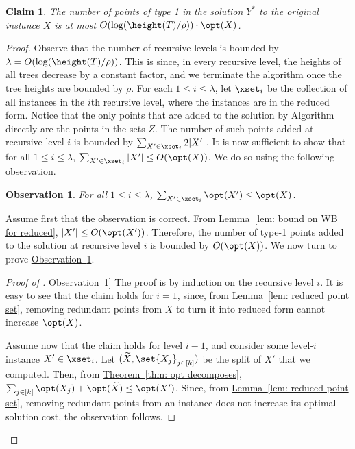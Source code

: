 \documentclass[11pt]{article}
\numberwithin{equation}{section}
\newtheorem{claim}[theorem]{Claim}
\theoremstyle{definition}
\theoremstyle{plain}
\newcommand{\expref}[2]{\hyperref[#2]{#1~\ref{#2}}}
\newtheorem{myobs}[theorem]{Observation}
\begin{document}
\begin{claim}\label{claim: type 1 points}
	The number of points of type 1 in the solution $Y^*$ to the original instance $X$ is at most $O(\log(\height(T)/\rho))\cdot \opt(X)$.
	\end{claim}

\begin{proof}
	Observe that the number of recursive levels is bounded by $\lambda =O(\log(\height(T)/\rho))$. 
	This is since, in every recursive level, the heights of all trees decrease by a constant factor, and we terminate the algorithm once the tree heights are bounded by $\rho$.
	 For each $1\leq i\leq \lambda$, let $\xset_i$ be the collection of all instances in the $i$th recursive level, where the instances are in the reduced form. Notice that the only points that are added to the solution by Algorithm \recBST directly are the points in the sets $Z$. The number of such points added at recursive level $i$ is bounded by $\sum_{X'\in \xset_i}2|X'|$. It is now sufficient to show that for all $1\leq i\leq \lambda$, $\sum_{X'\in \xset_i}|X'|\leq O(\opt(X))$. We do so using the following observation.
	
	\begin{myobs}\label{obs: type 1 points}
		For all $1\leq i\leq \lambda$, $\sum_{X'\in \xset_i}\opt(X')\leq \opt(X)$.
		\end{myobs}
	
	Assume first that the observation is correct. From \expref{Lemma}{lem: bound on WB for reduced}, $|X'|\leq O(\opt(X'))$. Therefore, the number of type-1 points added to  the solution at recursive level $i$ is bounded by $O(\opt(X))$.
We now turn to prove \expref{Observation}{obs: type 1 points}.
\begin{proof}[Proof of \expref{Observation}{obs: type 1 points}]
	The proof is by induction on the recursive level $i$. It is easy to see that the claim holds for $i=1$, since, from \expref{Lemma}{lem: reduced point set}, removing redundant points from $X$ to turn it into reduced form cannot increase $\opt(X)$.
	
	Assume now that the claim holds for level $i-1$, and consider some level-$i$ instance $X'\in \xset_i$. Let $(\widetilde{X},\set{X_j}_{j \in [k]})$ be the split of  $X'$ that we computed. Then, from  \expref{Theorem}{thm: opt decomposes}, $\sum_{j \in [k]}\opt(X_j) + \opt(\widetilde{X}) \leq \opt(X')$. Since, from \expref{Lemma}{lem: reduced point set}, removing redundant points from an instance does not increase its optimal solution cost, the observation follows.
\end{proof}		 
\end{proof}
\end{document}

